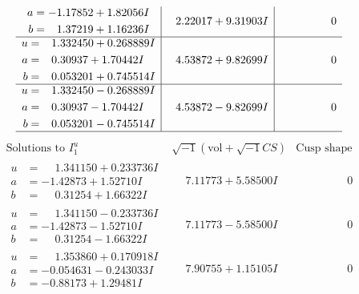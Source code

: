 \documentclass[1p]{elsarticle_modified}
\theoremstyle{definition}
\newcommand{\I}{\sqrt{-1}}
\begin{document}
$$\begin{array}{c|c|c}
\begin{aligned}
a &= -1.17852 + 1.82056 I \\
b &= \phantom{-}1.37219 + 1.16236 I\end{aligned}
 & \phantom{-}2.22017 + 9.31903 I & \phantom{-0.000000 } 0 \\ \hline\begin{aligned}
u &= \phantom{-}1.332450 + 0.268889 I \\
a &= \phantom{-}0.30937 + 1.70442 I \\
b &= \phantom{-}0.053201 + 0.745514 I\end{aligned}
 & \phantom{-}4.53872 + 9.82699 I & \phantom{-0.000000 } 0 \\ \hline\begin{aligned}
u &= \phantom{-}1.332450 - 0.268889 I \\
a &= \phantom{-}0.30937 - 1.70442 I \\
b &= \phantom{-}0.053201 - 0.745514 I\end{aligned}
 & \phantom{-}4.53872 - 9.82699 I & \phantom{-0.000000 } 0\\
 \hline 
 \end{array}$$\newpage$$\begin{array}{c|c|c}  
\text{Solutions to }I^u_{1}& \I (\text{vol} + \sqrt{-1}CS) & \text{Cusp shape}\\
 \hline 
\begin{aligned}
u &= \phantom{-}1.341150 + 0.233736 I \\
a &= -1.42873 + 1.52710 I \\
b &= \phantom{-}0.31254 + 1.66322 I\end{aligned}
 & \phantom{-}7.11773 + 5.58500 I & \phantom{-0.000000 } 0 \\ \hline\begin{aligned}
u &= \phantom{-}1.341150 - 0.233736 I \\
a &= -1.42873 - 1.52710 I \\
b &= \phantom{-}0.31254 - 1.66322 I\end{aligned}
 & \phantom{-}7.11773 - 5.58500 I & \phantom{-0.000000 } 0 \\ \hline\begin{aligned}
u &= \phantom{-}1.353860 + 0.170918 I \\
a &= -0.054631 - 0.243033 I \\
b &= -0.88173 + 1.29481 I\end{aligned}
 & \phantom{-}7.90755 + 1.15105 I & \phantom{-0.000000 } 0 \\ \hline\begin{aligned}

\end{aligned}
\end{array}$$
\end{document}

